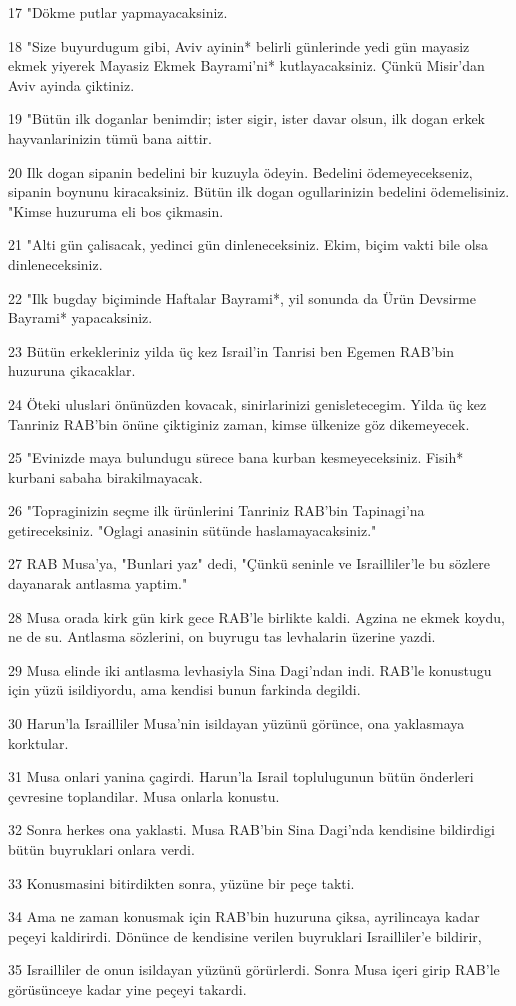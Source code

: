 \par 17 "Dökme putlar yapmayacaksiniz.
\par 18 "Size buyurdugum gibi, Aviv ayinin* belirli günlerinde yedi gün mayasiz ekmek yiyerek Mayasiz Ekmek Bayrami'ni* kutlayacaksiniz. Çünkü Misir'dan Aviv ayinda çiktiniz.
\par 19 "Bütün ilk doganlar benimdir; ister sigir, ister davar olsun, ilk dogan erkek hayvanlarinizin tümü bana aittir.
\par 20 Ilk dogan sipanin bedelini bir kuzuyla ödeyin. Bedelini ödemeyecekseniz, sipanin boynunu kiracaksiniz. Bütün ilk dogan ogullarinizin bedelini ödemelisiniz. "Kimse huzuruma eli bos çikmasin.
\par 21 "Alti gün çalisacak, yedinci gün dinleneceksiniz. Ekim, biçim vakti bile olsa dinleneceksiniz.
\par 22 "Ilk bugday biçiminde Haftalar Bayrami*, yil sonunda da Ürün Devsirme Bayrami* yapacaksiniz.
\par 23 Bütün erkekleriniz yilda üç kez Israil'in Tanrisi ben Egemen RAB'bin huzuruna çikacaklar.
\par 24 Öteki uluslari önünüzden kovacak, sinirlarinizi genisletecegim. Yilda üç kez Tanriniz RAB'bin önüne çiktiginiz zaman, kimse ülkenize göz dikemeyecek.
\par 25 "Evinizde maya bulundugu sürece bana kurban kesmeyeceksiniz. Fisih* kurbani sabaha birakilmayacak.
\par 26 "Topraginizin seçme ilk ürünlerini Tanriniz RAB'bin Tapinagi'na getireceksiniz. "Oglagi anasinin sütünde haslamayacaksiniz."
\par 27 RAB Musa'ya, "Bunlari yaz" dedi, "Çünkü seninle ve Israilliler'le bu sözlere dayanarak antlasma yaptim."
\par 28 Musa orada kirk gün kirk gece RAB'le birlikte kaldi. Agzina ne ekmek koydu, ne de su. Antlasma sözlerini, on buyrugu tas levhalarin üzerine yazdi.
\par 29 Musa elinde iki antlasma levhasiyla Sina Dagi'ndan indi. RAB'le konustugu için yüzü isildiyordu, ama kendisi bunun farkinda degildi.
\par 30 Harun'la Israilliler Musa'nin isildayan yüzünü görünce, ona yaklasmaya korktular.
\par 31 Musa onlari yanina çagirdi. Harun'la Israil toplulugunun bütün önderleri çevresine toplandilar. Musa onlarla konustu.
\par 32 Sonra herkes ona yaklasti. Musa RAB'bin Sina Dagi'nda kendisine bildirdigi bütün buyruklari onlara verdi.
\par 33 Konusmasini bitirdikten sonra, yüzüne bir peçe takti.
\par 34 Ama ne zaman konusmak için RAB'bin huzuruna çiksa, ayrilincaya kadar peçeyi kaldirirdi. Dönünce de kendisine verilen buyruklari Israilliler'e bildirir,
\par 35 Israilliler de onun isildayan yüzünü görürlerdi. Sonra Musa içeri girip RAB'le görüsünceye kadar yine peçeyi takardi.

